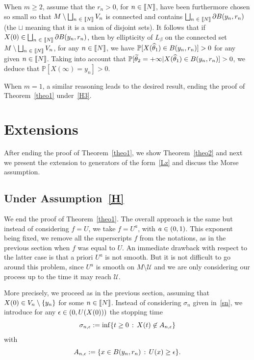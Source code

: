 \documentclass[AHL,Unicode,longabstracts,published]{cedram}
\newcommand{\cU}{\mathcal{U}}
\newcommand{\PP}{\mathbb{P}}
\newcommand{\iy}{\infty}
\newcommand{\pa}{\partial}
\newcommand{\wi}{\widetilde}
\newcommand{\wit}{\widehat}
\let\oldin\in
\renewcommand{\in}{\mathchoice{\oldin}{\oldin}{\,\oldin\,}{\,\oldin\,}}
\newcommand{\llbracket}{\mathopen{[\mkern -2.7mu[}}
\newcommand{\rrbracket}{\mathclose{]\mkern -2.7mu]}}
\newcommand{\lin}{\llbracket}
\newcommand{\rin}{\rrbracket}
\begin{document}
When $m\geq 2$, assume that the $r_n>0$, for $n\in\lin N\rin$, have been furthermore chosen so small so that $M\setminus \bigsqcup_{n\in\lin N\rin} V_n$ is connected and contains $\bigsqcup_{n\in\lin N\rin}\pa B(y_n,r_n)$ (the $\sqcup$ meaning that it is a union of disjoint sets). It follows that if $X(0)\in \bigsqcup_{n\in\lin N\rin}\pa B(y_n,r_n)$, then by ellipticity of $L_\beta$ on the connected set $M\setminus \bigsqcup_{n\in\lin N\rin} V_n$, for any $n\in\lin N\rin$, we have $\PP[X(\wit\theta_1)\in B(y_n,r_n)]>0$ for any given $n\in\lin N\rin$. Taking into account that $\PP[\wi\theta_2=+\iy\vert X(\wit\theta_1)\in B(y_n,r_n)]>0$, we deduce that $\PP[X(\iy)=y_n]>0$.


When $m=1$, a similar reasoning leads to the desired result, ending the proof of Theorem~\ref{theo1} under~\eqref{H3}.



\section{Extensions}\label{e}

After ending the proof of Theorem~\ref{theo1}, we show Theorem~\ref{theo2} and next we present the extension to generators of the form~\eqref{Lz} and discuss the Morse assumption.

\subsection{Under Assumption~\eqref{H}}

We end the proof of Theorem~\ref{theo1}. The overall approach is the same but instead of considering $f=U$, we take $f=U^a$, with $a\in (0,1)$. This exponent being fixed, we remove all the superscripts $f$ from the notations, as in the previous section when $f$ was equal to $U$. An immediate drawback with respect to the latter case is that a priori $U^a$ is not smooth. But it is not difficult to go around this problem, since $U^a$ is smooth on $M\setminus\cU$ and we are only considering our process up to the time it may reach $\cU$.


More precisely, we proceed as in the previous section, assuming that $X(0)\in V_n\setminus\{y_n\}$ for some $n\in\lin N\rin$. Instead of considering $\sigma_n$ given in~\eqref{sn}, we introduce for any $\epsilon\in(0,U(X(0)))$ the stopping time
\begin{equation*}
\sigma_{n,\epsilon} := \inf\{t\geq 0\,:\, X(t)\not\in A_{n,\epsilon}\}
\end{equation*}
with
\begin{equation*} 
A_{n,\epsilon}:= \{x\in B(y_n,r_n)\,:\, U(x)\geq \epsilon\}.
\end{equation*}
\end{document}
